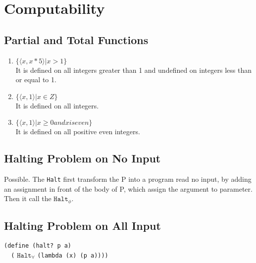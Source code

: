 \chapter{Computability}

\renewcommand\labelenumi{(\alph{enumi})}

\section{Partial and Total Functions}
\begin{enumerate}
  \item
  $ \{ \langle x, x*5 \rangle | x > 1\} $ \\
  It is defined on all integers greater than 1 and
  undefined on integers less than or equal to 1.

  \item
  $ \{ \langle x, 1 \rangle | x \in Z \} $ \\
  It is defined on all integers.

  \item
  $ \{ \langle x, 1 \rangle | x \ge 0 and x is even \} $ \\
  It is defined on all positive even integers.
\end{enumerate}


\section{Halting Problem on No Input}
Possible. The \texttt{Halt} first transform the P into a program
read no input, by adding an assignment in front of the body of P,
which assign the argument to parameter. Then it call the
${\mathtt{Halt}}_{\phi}$.


\section{Halting Problem on All Input}
\verb+(define (halt? p a)+ \\
\verb+  (+ ${\mathtt{Halt}}_{\forall}$ \verb+(lambda (x) (p a))))+
